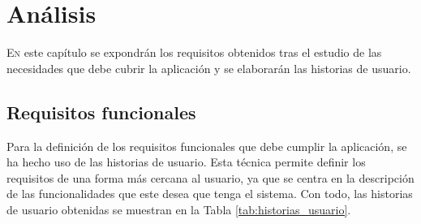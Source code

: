 \chapter{Análisis}
\label{chap:analisis}

\lettrine{E}{n} este capítulo se expondrán los requisitos obtenidos tras el estudio de las necesidades que debe cubrir la aplicación
y se elaborarán las historias de usuario.

\section{Requisitos funcionales}
\label{sec:analisis_requisitos_funcionales}

Para la definición de los requisitos funcionales que debe cumplir la aplicación, se ha hecho uso de las historias de usuario.
Esta técnica permite definir los requisitos de una forma más cercana al usuario, ya que se centra en la descripción
de las funcionalidades que este desea que tenga el sistema. Con todo, las historias de usuario obtenidas se muestran en la
Tabla \ref{tab:historias_usuario}.

